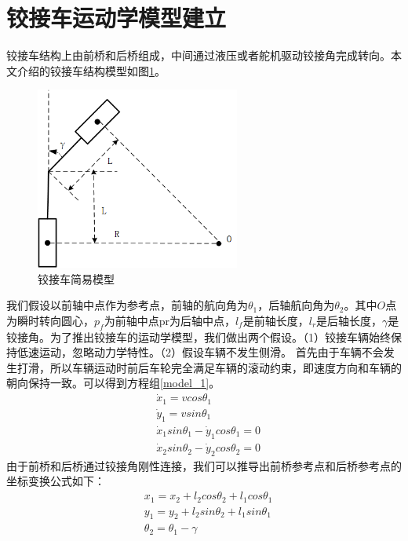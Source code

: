 \documentclass[master,academic]{ysuthesis} %
\begin{document}
	\section{铰接车运动学模型建立}
	铰接车结构上由前桥和后桥组成，中间通过液压或者舵机驱动铰接角完成转向。本文介绍的铰接车结构模型如图\ref{fig:铰接车简易模型}。
	\begin{figure}[!ht]
		\centering
		\includegraphics[width=0.6\textwidth]{铰接车简易模型.png}
		\caption{铰接车简易模型}
		\label{fig:铰接车简易模型}
	\end{figure}
	我们假设以前轴中点作为参考点，前轴的航向角为$\theta_1$，后轴航向角为$\theta_2$。其中$O$点为瞬时转向圆心，$p_f$为前轴中点pr为后轴中点，$l_f$是前轴长度，$l_r$是后轴长度，$\gamma$是铰接角。为了推出铰接车的运动学模型，我们做出两个假设。（1）铰接车辆始终保持低速运动，忽略动力学特性。（2）假设车辆不发生侧滑。
	首先由于车辆不会发生打滑，所以车辆运动时前后车轮完全满足车辆的滚动约束，即速度方向和车辆的朝向保持一致。可以得到方程组\ref{model_1}。
	\begin{equation}
		\begin{aligned}
			&\dot{x}_1=vcos\theta _1\\
			&\dot{y}_1=vsin\theta _1\\
			&\dot{x}_1sin\theta _1-\dot{y}_1cos\theta _1=0\\
			&\dot{x}_2sin\theta _2-\dot{y}_2cos\theta _2=0
		\end{aligned}
		\label{model_1}
	\end{equation}
	由于前桥和后桥通过铰接角刚性连接，我们可以推导出前桥参考点和后桥参考点的坐标变换公式如下：
	\begin{equation}
		\begin{aligned}
			&x_1=x_2+l_2cos\theta _2+l_1cos\theta _1\\
			&y_1=y_2+l_2sin\theta _2+l_1sin\theta _1\\
			&\theta _2=\theta _1-\gamma 
		\end{aligned}
	\end{equation}
\end{document}
